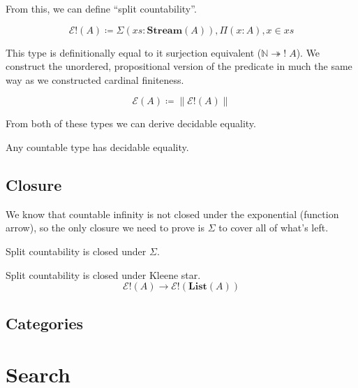 From this, we can define ``split countability''.
\begin{romdefinition}
  \begin{equation}
    \mathcal{E}!(A) \coloneqq \Sigma {(\mathit{xs} : \mathbf{Stream}(A))} , \Pi {(x : A)} , x \in \mathit{xs}
  \end{equation}
\end{romdefinition}
This type is definitionally equal to it surjection equivalent (\(\mathbb{N}
\twoheadrightarrow ! \; A\)).
We construct the unordered, propositional version of the predicate in much the
same way as we constructed cardinal finiteness.
\begin{romdefinition}[Countability]
  \begin{equation}
    \mathcal{E}(A) \coloneqq \lVert \mathcal{E}!(A) \rVert
  \end{equation}
\end{romdefinition}

From both of these types we can derive decidable equality.
\begin{romlemma}
  Any countable type has decidable equality.
\end{romlemma}
\subsection{Closure}
We know that countable infinity is not closed under the exponential (function
arrow), so the only closure we need to prove is \(\Sigma\) to cover all of
what's left.
\begin{romtheorem} \label{split-countability-sigma}
  Split countability is closed under \(\Sigma\).
\end{romtheorem}
\begin{romtheorem}
  Split countability is closed under Kleene star.
  \begin{equation}
    \mathcal{E}!(A) \rightarrow \mathcal{E}!(\mathbf{List}(A))
  \end{equation}
\end{romtheorem}
\subsection{Categories}
\section{Search}
